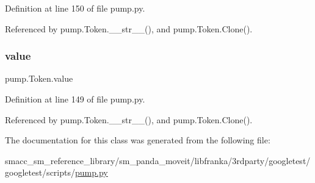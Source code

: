 Definition at line 150 of file pump.\+py.



Referenced by pump.\+Token.\+\_\+\+\_\+str\+\_\+\+\_\+(), and pump.\+Token.\+Clone().

\mbox{\label{classpump_1_1Token_a5b7ab395a380b775b2bf0a8b0abfda86}} 
\subsubsection{\texorpdfstring{value}{value}}
{\footnotesize\ttfamily pump.\+Token.\+value}



Definition at line 149 of file pump.\+py.



Referenced by pump.\+Token.\+\_\+\+\_\+str\+\_\+\+\_\+(), and pump.\+Token.\+Clone().



The documentation for this class was generated from the following file\+:\begin{DoxyCompactItemize}
\item 
smacc\+\_\+sm\+\_\+reference\+\_\+library/sm\+\_\+panda\+\_\+moveit/libfranka/3rdparty/googletest/googletest/scripts/\hyperlink{pump_8py}{pump.\+py}\end{DoxyCompactItemize}
